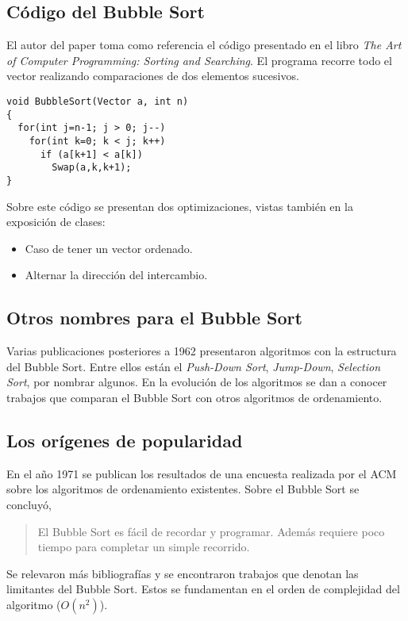 \documentclass[conference]{IEEEtran}
\begin{document}
\subsection{Código del Bubble Sort}
\label{sec:origen-bubble-sort}

El autor del paper toma como referencia el código presentado en el
libro \emph{The Art of Computer Programming: Sorting and
  Searching}. El programa recorre todo el vector realizando
comparaciones de dos elementos sucesivos.
\begin{verbatim}
void BubbleSort(Vector a, int n)
{
  for(int j=n-1; j > 0; j--)
    for(int k=0; k < j; k++)
      if (a[k+1] < a[k])
        Swap(a,k,k+1);
}
\end{verbatim}

Sobre este código se presentan dos optimizaciones, vistas también en
la exposición de clases:
\begin{itemize}
\item Caso de tener un vector ordenado.
\item Alternar la  dirección del intercambio.
\end{itemize}

\subsection{Otros nombres para el Bubble Sort}
\label{sec:origen-otro-nombre}

Varias publicaciones posteriores a 1962 presentaron algoritmos con la
estructura del Bubble Sort. Entre ellos están el \emph{Push-Down
  Sort}, \emph{Jump-Down}, \emph{Selection Sort}, por nombrar
algunos. En la evolución de los algoritmos se dan a conocer trabajos
que comparan el Bubble Sort con otros algoritmos de ordenamiento.

\subsection{Los orígenes de popularidad}
\label{sec:origen-popu}

En el año 1971 se publican los resultados de una encuesta realizada
por el ACM sobre los algoritmos de ordenamiento existentes. Sobre el
Bubble Sort se concluyó,
\begin{quote}
El Bubble Sort es fácil de recordar y programar. Además requiere poco
tiempo para completar un simple recorrido.   
\end{quote}

Se relevaron más bibliografías y se encontraron trabajos que denotan
las limitantes del Bubble Sort. Estos se fundamentan en el orden de
complejidad del algoritmo ($O(n^2)$). 
\end{document}
